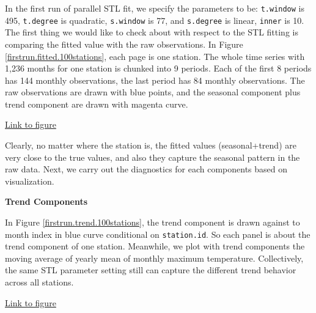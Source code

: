 In the first run of parallel STL fit, we specify the parameters to be: 
\texttt{t.window} is 495, \texttt{t.degree} is quadratic, \texttt{s.window} is 
77, and \texttt{s.degree} is linear, \texttt{inner} is 10. The first thing we would 
like to check about with respect to the STL fitting is comparing the fitted value 
with the raw observations. In Figure 
\href{../plots/100stations/first_run/fitted.100stations.tmax.pdf}
{\ref*{firstrun.fitted.100stations}}, each page is one station. The whole time 
series with 1,236 months for one station is chunked into 9 periods. Each of the 
first 8 periods has 144 monthly observations, the last period has 84 monthly 
observations. The raw observations are drawn with blue points, and the seasonal 
component plus trend component are drawn with magenta curve.  

\begin{framed}
\begin{center}
  \href{../plots/100stations/first_run/fitted.100stations.tmax.pdf}{Link to figure}
  \label{firstrun.fitted.100stations}
\end{center}
\end{framed}

Clearly, no matter where the station is, the fitted values (seasonal+trend) are 
very close to the true values, and also they capture the seasonal pattern in the 
raw data. Next, we carry out the diagnostics for each components based on 
visualization.

\textbf{Trend Components}

In Figure \href{../plots/100stations/first_run/trend.100stations.tmax.pdf}
{\ref*{firstrun.trend.100stations}}, the trend component is drawn against to month
index in blue curve conditional on \texttt{station.id}. So each panel is about 
the trend component of one station. Meanwhile, we plot with trend components 
the moving average of yearly mean of monthly maximum temperature.
Collectively, the same STL parameter setting still can capture the different trend
behavior across all stations.

\begin{framed}
\begin{center}
  \href{../plots/100stations/first_run/trend.100stations.tmax.pdf}{Link to figure}
  \label{firstrun.trend.100stations}
\end{center}
\end{framed}

